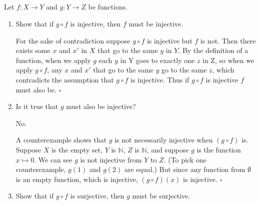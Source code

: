 \documentclass[../../main.tex]{subfiles}
\begin{document}
\subsection{}
\begin{q}
Let $f: X \to Y$ and $g: Y \to Z$ be functions.
\end{q}

\begin{enumerate}
    \item
    \begin{q}
        Show that if $g \circ f$ is injective, then $f$ must be injective.
    \end{q}

    \begin{prf}
        For the sake of contradiction suppose $g \circ f$ is injective but $f$ is not.
        Then there exists some $x$ and $x'$ in $X$ that go to the same $y$ in $Y$.
        By the definition of a function, when we apply $g$ each $y$ in Y goes to exactly one $z$ in Z, so when we apply $g \circ f$, any $x$ and $x'$ that go to the same $y$ go to the same $z$, which contradicts the assumption that $g \circ f$ is injective.
        Thus if $g \circ f$ is injective $f$ must also be.
        $\square$
    \end{prf}

    \item
    \begin{q}
        Is it true that $g$ must also be injective?
    \end{q}

   \begin{ans}
     No.
   \end{ans}

    \begin{prf}
        A counterexample shows that $g$ is not necessarily injective when $(g \circ f)$ is.
        Suppose $X$ is the empty set, $Y$ is $\mathbb{N}$, $Z$ is $\mathbb{N}$, and suppose $g$ is the function $x \mapsto 0$.
        We can see $g$ is not injective from $Y$ to $Z$. (To pick one counterexample, $g(1)$ and $g(2)$ are equal.)
        But since any function from $\emptyset$ is an empty function, which is injective, $(g \circ f)(x)$ is injective.
        $\square$
    \end{prf}

    \item
    \begin{q}
        Show that if $g \circ f$ is surjective, then $g$ must be surjective.
    \end{q}


\end{enumerate}
\end{document}
